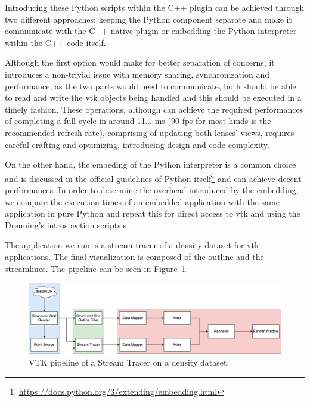 Introducing these Python scripts within the C++ plugin can be achieved through two different approaches: keeping the Python component separate and make it communicate with the C++ native plugin or embedding the Python interpreter within the C++ code itself. 

Although the first option would make for better separation of concerns, it introduces a non-trivial issue with memory sharing, synchronization and performance, as the two parts would need to communicate, both should be able to read and write the \acrshort{vtk} objects being handled and this should be executed in a timely fashion. These operations, although can achieve the required performances of completing a full cycle in around 11.1 ms (90 \acrshort{fps} for most \acrshort{hmd}s is the recommended refresh rate), comprising of updating both lenses' views, requires careful crafting and optimizing, introducing design and code complexity.

On the other hand, the embeding of the Python interpreter is a common choice and is discussed in the official guidelines of Python itself\footnote{\url{https://docs.python.org/3/extending/embedding.html}} and can achieve decent performances. In order to determine the overhead introduced by the embedding, we compare the execution times of an embedded application with the same application in pure Python and repeat this for direct access to \acrshort{vtk} and using the Dreuning's introspection scripts.s

The application we run is a stream tracer of a density dataset for \acrshort{vtk} applications. The final visualization is composed of the outline and the streamlines. The pipeline can be seen in Figure~\ref{fig:streamtracer_pipeline}.

\begin{figure}
    \centering
    \includegraphics[width=\textwidth]{pictures/streamtracer_pipeline.png}
    \caption{VTK pipeline of a Stream Tracer on a density dataset.}
    \label{fig:streamtracer_pipeline}
\end{figure}